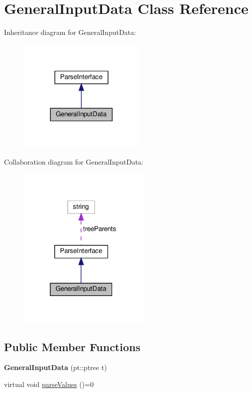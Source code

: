 \hypertarget{classGeneralInputData}{}\section{General\+Input\+Data Class Reference}
\label{classGeneralInputData}


Inheritance diagram for General\+Input\+Data\+:
\nopagebreak
\begin{figure}[H]
\begin{center}
\leavevmode
\includegraphics[width=173pt]{classGeneralInputData__inherit__graph}
\end{center}
\end{figure}


Collaboration diagram for General\+Input\+Data\+:
\nopagebreak
\begin{figure}[H]
\begin{center}
\leavevmode
\includegraphics[width=181pt]{classGeneralInputData__coll__graph}
\end{center}
\end{figure}
\subsection*{Public Member Functions}
\begin{DoxyCompactItemize}
\item 
\mbox{\label{classGeneralInputData_a2c346d4ccd99311140519ac675ab6c29}} 
{\bfseries General\+Input\+Data} (pt\+::ptree t)
\item 
virtual void \hyperlink{classGeneralInputData_a674714bd018eea1a601ae9c4b8212c4a}{parse\+Values} ()=0
\end{DoxyCompactItemize}
